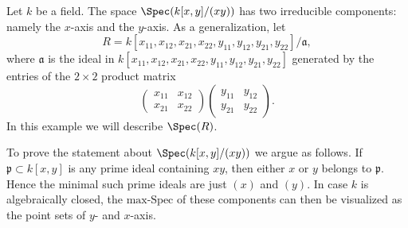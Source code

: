 \begin{example}
\label{example-product-matrices-zero}
Let $k$ be a field. The space $\Spec(k[x, y]/(xy))$
has two irreducible components: namely the $x$-axis and the
$y$-axis. As a generalization, let
$$
R = k[x_{11}, x_{12}, x_{21}, x_{22}, y_{11}, y_{12}, y_{21}, y_{22}]/
\mathfrak a,
$$
where $\mathfrak a$ is the ideal in
$k[x_{11}, x_{12}, x_{21}, x_{22}, y_{11}, y_{12}, y_{21}, y_{22}]$
generated by the entries of the $2 \times 2$ product matrix
$$
\left(
\begin{matrix}
x_{11} & x_{12}\\
x_{21} & x_{22}
\end{matrix}
\right)
 \left(
\begin{matrix}
y_{11} & y_{12}\\
y_{21} & y_{22}
\end{matrix}
\right).
$$
In this example we will describe $\Spec(R)$.

\medskip\noindent
To prove the statement about $\Spec(k[x, y]/(xy))$ we argue as follows.
If $\mathfrak p\subset k[x,y]$ is any prime ideal containing $xy$,
then either $x$ or $y$ belongs to $\mathfrak p$. Hence the minimal such
prime ideals are just $(x)$ and $(y)$. In case $k$ is
algebraically closed, the $\text{max-Spec}$ of these components
can then be visualized as the point sets of $y$- and $x$-axis.


\end{example}
